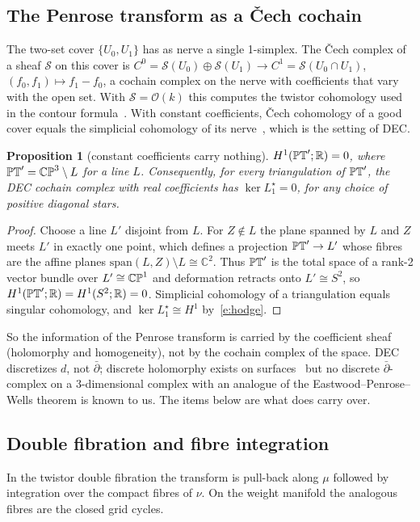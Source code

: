\documentclass[10pt]{article}
\newtheorem{prop}[thm]{Proposition}
\theoremstyle{definition}
\newcommand{\R}{\mathbb R}\newcommand{\Z}{\mathbb Z}\newcommand{\C}{\mathbb C}
\newcommand{\cO}{\mathcal O}\newcommand{\cH}{\mathcal H}
\begin{document}
\subsection{The Penrose transform as a \v{C}ech cochain}
The two-set cover $\{U_0,U_1\}$ has as nerve a single 1-simplex. The \v{C}ech complex of a sheaf $\mathcal S$ on this cover is $C^0=\mathcal S(U_0)\oplus\mathcal S(U_1)\to C^1=\mathcal S(U_0\cap U_1)$, $(f_0,f_1)\mapsto f_1-f_0$, a cochain complex on the nerve with coefficients that vary with the open set. With $\mathcal S=\cO(k)$ this computes the twistor cohomology used in the contour formula~\cite{adm17}. With constant coefficients, \v{C}ech cohomology of a good cover equals the simplicial cohomology of its nerve~\cite{botttu}, which is the setting of DEC.

\begin{prop}[constant coefficients carry nothing]\label{p:const}
$H^1(\PT';\R)=0$, where $\mathbb{PT}'=\mathbb{CP}^3\setminus L$ for a line $L$. Consequently, for every triangulation of $\mathbb{PT}'$, the DEC cochain complex with real coefficients has $\ker L_1^\star=0$, for any choice of positive diagonal stars.
\end{prop}
\begin{proof}
Choose a line $L'$ disjoint from $L$. For $Z\notin L$ the plane spanned by $L$ and $Z$ meets $L'$ in exactly one point, which defines a projection $\mathbb{PT}'\to L'$ whose fibres are the affine planes $\mathrm{span}(L,Z)\setminus L\cong\C^2$. Thus $\mathbb{PT}'$ is the total space of a rank-2 vector bundle over $L'\cong\mathbb{CP}^1$ and deformation retracts onto $L'\cong S^2$, so $H^1(\PT';\R)=H^1(S^2;\R)=0$. Simplicial cohomology of a triangulation equals singular cohomology, and $\ker L_1^\star\cong H^1$ by~\eqref{e:hodge}.
\end{proof}

So the information of the Penrose transform is carried by the coefficient sheaf (holomorphy and homogeneity), not by the cochain complex of the space. DEC discretizes $d$, not $\bar\partial$; discrete holomorphy exists on surfaces~\cite{mercat} but no discrete $\bar\partial$-complex on a 3-dimensional complex with an analogue of the Eastwood--Penrose--Wells theorem is known to us. The items below are what does carry over.

\subsection{Double fibration and fibre integration}
In the twistor double fibration the transform is pull-back along $\mu$ followed by integration over the compact fibres of $\nu$. On the weight manifold the analogous fibres are the closed grid cycles.
\end{document}
